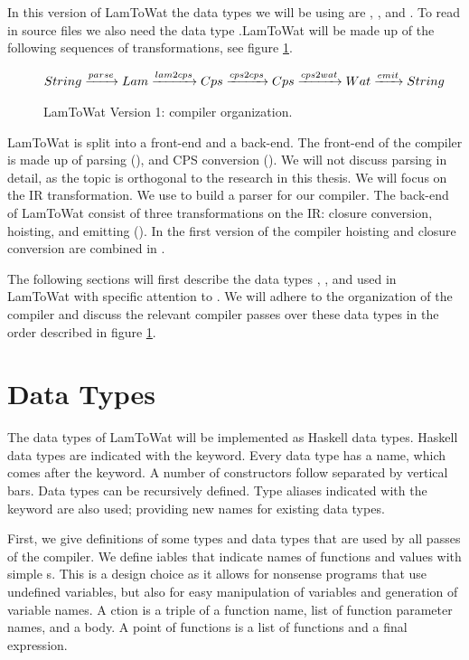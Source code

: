 In this version of LamToWat the data types we will be using are , , and . To read in source files we also need the data type .LamToWat will be made up of the following sequences of transformations, see figure \ref{fig:lam2watv1org}.

\begin{figure}
\begin{gather*}
  String \xrightarrow{parse} Lam \xrightarrow{lam2cps} Cps \xrightarrow{cps2cps} Cps \xrightarrow{cps2wat} Wat \xrightarrow{emit} String
\end{gather*}
\caption{LamToWat Version 1: compiler organization.}
\label{fig:lam2watv1org}
\end{figure}

LamToWat is split into a front-end and a back-end. The front-end of the compiler is made up of parsing (), and CPS conversion (). We will not discuss  parsing in detail, as the topic is orthogonal to the research in this thesis. We will focus on the IR transformation. We use  \autocite{parsec} to build a parser for our compiler. The back-end of LamToWat consist of three transformations on the IR: closure conversion, hoisting, and emitting (). In the first version of the compiler hoisting and closure conversion are combined in .

The following sections will first describe the data types , , and  used in LamToWat with specific attention to . We will adhere to the organization of the compiler and discuss the relevant compiler passes over these data types in the order described in figure \ref{fig:lam2watv1org}.

\section{\label{section:datatypes}Data Types}
The data types of LamToWat will be implemented as Haskell data types. Haskell data types are indicated with the  keyword. Every data type has a name, which comes after the keyword. A number of constructors follow separated by vertical bars. Data types can be recursively defined. Type aliases indicated with the  keyword are also used; providing new names for existing data types.

First, we give definitions of some types and data types that are used by all passes of the compiler. We define iables that indicate names of functions and values with simple s. This is a design choice as it allows for nonsense programs that use undefined variables, but also for easy manipulation of variables and generation of variable names. A ction is a triple of a function name, list of function parameter names, and a body. A point of functions is a list of functions and a final expression.

